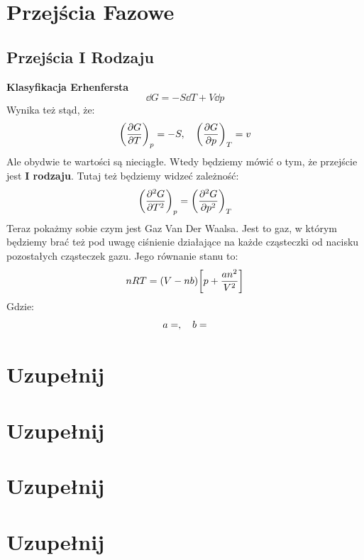 \documentclass[12pt,a4paper]{report}
\renewcommand{\emph}{\textbf}
\newenvironment{lecture}[1]{\par\medskip
   \noindent\chapter{#1} \rmfamily}{\medskip}
\begin{document}

\begin{lecture}{Przejścia Fazowe}
    \section{Przejścia I Rodzaju}
    \emph{Klasyfikacja Erhenfersta}
    \[
        \dd{G} = - S \dd{T} + V \dd{p}
    \]
    Wynika też stąd, że:
    \[
       \qty(\pdv{G}{T})_{p} = -S \qc \qty(\pdv{G}{p})_{T} = v
    \]
    Ale obydwie te wartości są nieciągłe. Wtedy będziemy mówić o tym, że przejście jest \emph{I rodzaju}.
    Tutaj też będziemy widzeć zależność:
    \[
      \qty(\pdv[2]{G}{T})_{p} = \qty(\pdv[2]{G}{p})_{T}  
    \]
    Teraz pokażmy sobie czym jest Gaz Van Der Waalsa.
    Jest to gaz, w którym będziemy brać też pod uwagę ciśnienie działające na każde cząsteczki od nacisku pozostałych cząsteczek gazu. Jego równanie stanu to:
    \begin{equation}
        n R T = \qty(V -n b)\qty[p + \frac{a n^2}{V^2}]
        \label{eq:lec_17:van_der_waals}
    \end{equation}
    Gdzie:
    \[
      a = \qc b =   
    \]
\end{lecture}


\begin{lecture}{Uzupełnij}
    
\end{lecture}



\begin{lecture}{Uzupełnij}
    
\end{lecture}


\begin{lecture}{Uzupełnij}
    
\end{lecture}


\begin{lecture}{Uzupełnij}
    
\end{lecture}
\end{document}
